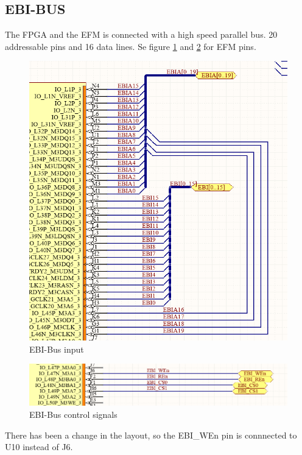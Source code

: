 \subsection{EBI-BUS}
The FPGA and the EFM is connected with a high speed parallel bus. 20 addressable pins and 16 data lines.  Se figure \ref{fig:EbiBus} and \ref{fig:EbiControl} for EFM pins.


\begin{figure}
    \includegraphics[width=\linewidth]{img/EBI-bus.png}
    \caption{EBI-Bus input}
    \label{fig:EbiBus}
\end{figure}

\begin{figure}
    \includegraphics[width=\linewidth]{img/EBI-bus_2.png}
    \caption{EBI-Bus control signals}
    \label{fig:EbiControl}
\end{figure}

There has been a change in the layout, so the EBI\_WEn pin is connnected to U10 instead of J6.
